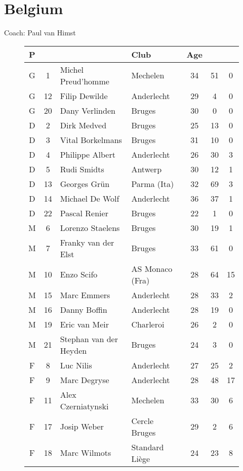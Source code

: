 \chapter{Belgium}
\newline
\newline
Coach: Paul van Himst
\begin{figure}[H]
\begin{tabular}{c c l l c c c}
P & & & Club & Age \\ \hline
G & 1 & Michel Preud'homme & Mechelen & 34 & 51 & 0 \\
G & 12 & Filip Dewilde & Anderlecht & 29 & 4 & 0 \\
G & 20 & Dany Verlinden & Bruges & 30 & 0 & 0 \\ \hline
D & 2 & Dirk Medved & Bruges & 25 & 13 &  0 \\
D & 3 & Vital Borkelmans & Bruges & 31 & 10 &  0 \\
D & 4 & Philippe Albert & Anderlecht & 26 & 30 &  3 \\
D & 5 & Rudi Smidts & Antwerp &  30 & 12 &  1 \\
D & 13 & Georges Gr{\"u}n & Parma (Ita) & 32 & 69 & 3 \\
D & 14 & Michael De Wolf & Anderlecht & 36 & 37 & 1 \\
D & 22 & Pascal Renier & Bruges & 22 & 1 & 0 \\ \hline
M & 6 & Lorenzo Staelens & Bruges & 30 & 19 & 1 \\
M & 7 & Franky van der Elst & Bruges &   33 & 61 &  0 \\
M & 10 & Enzo Scifo & AS Monaco (Fra) & 28 & 64 & 15 \\
M & 15 & Marc Emmers & Anderlecht & 28 & 33 &  2 \\
M & 16 & Danny Boffin & Anderlecht & 28 & 19 &  0 \\
M & 19 & Eric van Meir & Charleroi & 26 &  2 &  0 \\
M & 21 & Stephan van der Heyden & Bruges & 24 &  3 &  0 \\ \hline
F & 8 & Luc Nilis & Anderlecht & 27 & 25 &  2 \\
F & 9 & Marc Degryse & Anderlecht & 28 & 48 & 17 \\
F & 11 & Alex Czerniatynski & Mechelen & 33 & 30 &  6 \\
F & 17 & Josip Weber & Cercle Bruges & 29 &  2 &  6 \\
F & 18 & Marc Wilmots & Standard Li{\`e}ge & 24 & 23 &  8 \\ \hline
\end{tabular}
\end{figure}
